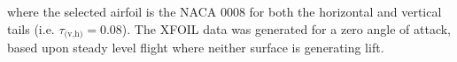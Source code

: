 where the selected airfoil is the NACA 0008 for both the horizontal and vertical tails (i.e. $\tau_{\text{(v,h)}} = 0.08$). 
The XFOIL data was generated for a zero angle of attack, based upon steady level flight where neither surface is generating lift.  



% 
% 
% 
% 
% 

